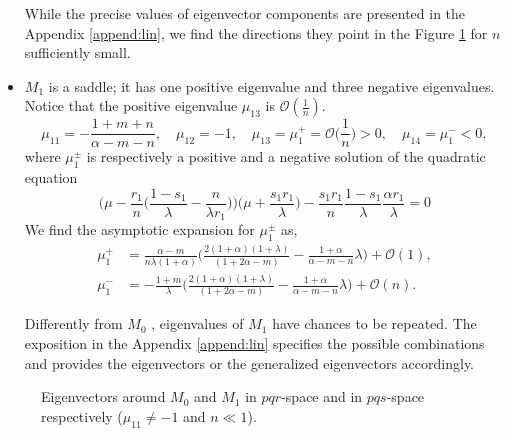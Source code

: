 \documentclass[a4paper,11pt]{article}
\def\BO{{\mathcal{O}}}
\theoremstyle{remark}
\begin{document}
\begin{itemize}
 While the precise values of eigenvector components are presented in the Appendix \ref{append:lin}, we find the directions they point in the Figure \ref{fig:equilibria} for $n$ sufficiently small.
 \item $M_1$ is a saddle; it has one positive eigenvalue and three negative eigenvalues. Notice that the positive eigenvalue $\mu_{13}$ is $\mathcal{O}( \frac{1}{n})$.
\begin{equation}
 \mu_{11}=-\frac{1+m+n}{\alpha-m-n}, \quad \mu_{12}=-1, \quad \mu_{13}=\mu_1^+=\BO\Big(\frac{1}{n}\Big)>0, \quad \mu_{14}=\mu_1^{-}<0,
\end{equation}
where $\mu_1^\pm$ is respectively a positive and a negative solution of the quadratic equation
 $$ \Big(\mu - \frac{r_1}{n}\Big(\frac{1-s_1}{\lambda}-\frac{n}{\lambda r_1}\Big)\Big)\Big(\mu + \frac{s_1r_1}{\lambda}\Big) - \frac{s_1r_1}{n} \frac{1-s_1}{\lambda}\frac{\alpha r_1}{\lambda} = 0$$
We find the asymptotic expansion for $\mu_1^\pm$ as,
\begin{align*}
\mu_1^+ &= \frac{\alpha-m}{n\lambda(1+\alpha)}\Big(\frac{2(1+\alpha)(1+\lambda)}{(1+2\alpha-m) } - \frac{1+\alpha}{\alpha-m-n}\lambda\Big) + \BO(1), \\
\mu_1^- &= -\frac{1+m}{\lambda}\Big(\frac{2(1+\alpha)(1+\lambda)}{(1+2\alpha-m) } - \frac{1+\alpha}{\alpha-m-n}\lambda\Big) + \BO(n).
\end{align*}

Differently from $M_0$ , eigenvalues of $M_1$ have chances to be repeated. The exposition in the Appendix \ref{append:lin} specifies the possible combinations and provides the eigenvectors or the generalized eigenvectors accordingly.
\end{itemize}
\begin{figure}
 \centering
  \subfigure[$pqr$-space]{
  \psfrag{r}{\scriptsize$r$}%
  \texttt{[image: equilibriapqr.eps]}\label{fig:eq1}
  }
  \quad \quad
  \subfigure[$pqs$-space]{
  \psfrag{r}{\scriptsize$s-\frac{1+m}{1+\alpha}$}%
  \texttt{[image: equilibriapqs.eps]}\label{fig:eq2}
  }
  \caption{Eigenvectors around $M_0$ and $M_1$ in $pqr$-space and in $pqs$-space respectively ($\mu_{11}\ne-1$ and $n\ll1$). } \label{fig:equilibria}
\end{figure}
\end{document}
